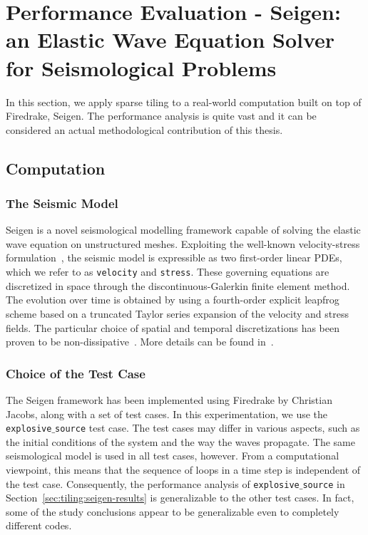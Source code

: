 \section{Performance Evaluation - Seigen: an Elastic Wave Equation Solver for Seismological Problems}
\label{sec:tiling:seigen}
In this section, we apply sparse tiling to a real-world computation built on top of Firedrake, Seigen. The performance analysis is quite vast and it can be considered an actual methodological contribution of this thesis.

\subsection{Computation}
\label{sec:tiling:seigen:comp}

\subsubsection{The Seismic Model}
Seigen is a novel seismological modelling framework capable of solving the elastic wave equation on unstructured meshes. Exploiting the well-known velocity-stress formulation~\citep{Seigen-3}, the seismic model is expressible as two first-order linear PDEs, which we refer to as {\tt velocity} and {\tt stress}. These governing equations are discretized in space through the discontinuous-Galerkin finite element method. The evolution over time is obtained by using a fourth-order explicit leapfrog scheme based on a truncated Taylor series expansion of the velocity and stress fields. The particular choice of spatial and temporal discretizations has been proven to be non-dissipative~\citep{Seigen-1}. More details can be found in~\cite{Seigen-paper}.

\subsubsection{Choice of the Test Case}
The Seigen framework has been implemented using Firedrake by Christian Jacobs, along with a set of test cases. In this experimentation, we use the {\tt explosive$\_$source} test case. The test cases may differ in various aspects, such as the initial conditions of the system and the way the waves propagate. The same seismological model is used in all test cases, however. From a computational viewpoint, this means that the sequence of loops in a time step is independent of the test case. Consequently, the performance analysis of {\tt explosive$\_$source} in Section~\ref{sec:tiling:seigen-results} is generalizable to the other test cases. In fact, some of the study conclusions appear to be generalizable even to completely different codes. 


